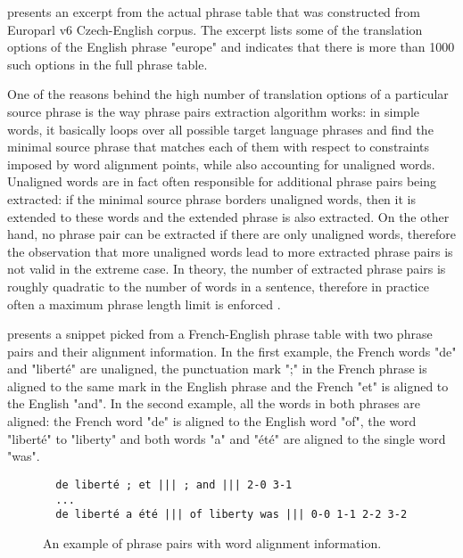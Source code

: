  presents an excerpt from the actual phrase table
that was constructed from Europarl v6 Czech-English corpus.
The excerpt lists some of the translation options of the English phrase "europe" and
indicates that there is more than 1000 such options in the full phrase table.

One of the reasons behind the high number of translation options of a particular
source phrase is the way phrase pairs extraction algorithm works:
in simple words, it basically loops over all possible target language phrases
and find the minimal source phrase that matches each of them with respect to
constraints imposed by word alignment points, while also accounting for
unaligned words.
Unaligned words are in fact often responsible for additional phrase pairs
being extracted: if the minimal source phrase borders unaligned words,
then it is extended to these words and the extended phrase is also extracted.
On the other hand, no phrase pair can be extracted if there are only unaligned
words, therefore the observation that more unaligned words lead to more
extracted phrase pairs is not valid in the extreme case.
In theory, the number of extracted phrase pairs is roughly quadratic to the number
of words in a sentence, therefore in practice often a maximum phrase length limit
is enforced \citep[Chapter 5.2]{koehn:smt}.

 presents a snippet picked from a French-English
phrase table with two phrase pairs and their alignment information.
In the first example, the French words "de" and "liberté" are unaligned,
the punctuation mark ";" in the French phrase is aligned to the same mark in the English phrase
and the French "et" is aligned to the English "and".
In the second example, all the words in both phrases are aligned:
the French word "de" is aligned to the English word "of", the word "liberté" to "liberty"
and both words "a" and "été" are aligned to the single word "was".

\begin{figure}[ht]
\begin{verbatim}
  de liberté ; et ||| ; and ||| 2-0 3-1
  ...
  de liberté a été ||| of liberty was ||| 0-0 1-1 2-2 3-2
\end{verbatim}
\caption{\label{fig:phrase-pair-alignment}
An example of phrase pairs with word alignment information.}
\end{figure}


